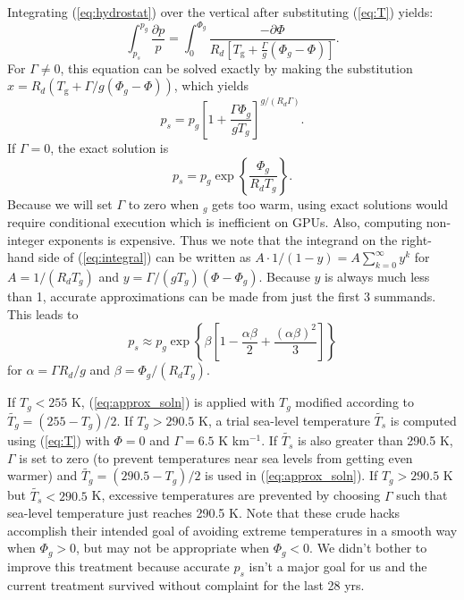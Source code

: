 Integrating (\ref{eq:hydrostat}) over the vertical after substituting (\ref{eq:T}) yields:
\begin{equation}
  \int_{p_s}^{p_g} \frac{\partial p}{p} = \int_0^{\Phi_g} \frac{-\partial \Phi}{R_d \left[T_\mathrm{g} + \frac{\Gamma}{g}\left(\Phi_g - \Phi\right)\right]}.
  \label{eq:integral}
\end{equation}
For $\Gamma \ne 0$, this equation can be solved exactly by making the substitution $x = R_d (T_\mathrm{g} + \Gamma/g \left(\Phi_g - \Phi\right) )$, which yields
\begin{equation}
  p_s = p_g \left[ 1+\frac{\Gamma \Phi_g}{g T_g} \right]^{g/(R_d \Gamma)}.
  \label{eq:exact_soln}
\end{equation}
If $\Gamma=0$, the exact solution is
\begin{equation}
  p_s = p_g \exp\left\{\frac{\Phi_g}{R_d T_g}\right\}.
  \label{eq:exact_0gamma}
\end{equation}
Because we will set $\Gamma$ to zero when $_g$ gets too warm, using exact solutions would require conditional execution which is inefficient on GPUs. Also, computing non-integer exponents is expensive. Thus we note that the integrand on the right-hand side of (\ref{eq:integral}) can be written as $A \cdot 1/(1-y) = A \sum_{k=0}^\infty y^k$ for $A=1/(R_d T_g)$ and $y=\Gamma/(g T_g)(\Phi - \Phi_g)$. Because $y$ is always much less than 1, accurate approximations can be made from just the first 3 summands. This leads to
\begin{equation}
  p_s \approx p_g \exp\left\{\beta \left[1 - \frac{\alpha \beta}{2} + \frac{(\alpha \beta)^2}{3} \right] \right\}
  \label{eq:approx_soln}
\end{equation}
for $\alpha=\Gamma R_d/g$ and $\beta=\Phi_g/(R_d T_g)$.

If $T_g<255$ K, (\ref{eq:approx_soln}) is applied with $T_g$ modified according to $\widetilde{T_g} = (255 - T_g)/2$. If $T_g>290.5$ K, a trial sea-level temperature $\widetilde{T_s}$ is computed using (\ref{eq:T}) with $\Phi = 0$ and $\Gamma = 6.5$ K km$^{-1}$. If $\widetilde{T_s}$ is also greater than 290.5 K, $\Gamma$ is set to zero (to prevent temperatures near sea levels from getting even warmer) and $\widetilde{T_g} = (290.5 - T_g)/2$ is used in (\ref{eq:approx_soln}). If $T_g>290.5$ K but $\widetilde{T_s}<290.5$ K, excessive temperatures are prevented by choosing $\Gamma$ such that sea-level temperature just reaches 290.5 K. Note that these crude hacks accomplish their intended goal of avoiding extreme temperatures in a smooth way when $\Phi_g>0$, but may not be appropriate when $\Phi_g<0$. We didn't bother to improve this treatment because accurate $p_s$ isn't a major goal for us and  the current treatment survived without complaint for the last 28 yrs. 

